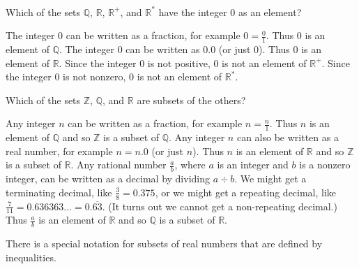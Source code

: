 \begin{exam}
\label{exam_sets_reals}
~
    \begin{apart}
        \item Which of the sets $\mathbb{Q}$, $\mathbb{R}$, $\mathbb{R}^+$, and $\mathbb{R}^*$ have the integer 0 as an element?
            \begin{soln}
                The integer 0 can be written as a fraction, for example $0 = \frac{0}{1}$.  Thus 0 is an element of $\mathbb{Q}$.  The integer 0 can be written as 0.0 (or just 0).  Thus 0 is an element of $\mathbb{R}$.  Since the integer 0 is not positive, 0 is not an element of $\mathbb{R}^+$.  Since the integer 0 is not nonzero, 0 is not an element of $\mathbb{R}^*$.
            \end{soln}
        \item Which of the sets $\mathbb{Z}$, $\mathbb{Q}$, and $\mathbb{R}$ are subsets of the others?
            \begin{soln}
                Any integer $n$ can be written as a fraction, for example $n = \frac{n}{1}$.  Thus $n$ is an element of $\mathbb{Q}$ and so $\mathbb{Z}$ is a subset of $\mathbb{Q}$.  Any integer $n$ can also be written as a real number, for example $n = n.0$ (or just $n$).  Thus $n$ is an element of $\mathbb{R}$ and so $\mathbb{Z}$ is a subset of $\mathbb{R}$.  Any rational number $\frac{a}{b}$, where $a$ is an integer and $b$ is a nonzero integer, can be written as a decimal by dividing $a \div b$.  We might get a terminating decimal, like $\frac{3}{8}=0.375$, or we might get a repeating decimal, like $\frac{7}{11} = 0.636363\ldots = 0.\overline{63}$.  (It turns out we cannot get a non-repeating decimal.)  Thus $\frac{a}{b}$ is an element of $\mathbb{R}$ and so $\mathbb{Q}$ is a subset of $\mathbb{R}$.
            \end{soln}
    \end{apart}
\end{exam}

There is a special notation for subsets of real numbers that are defined by inequalities.

